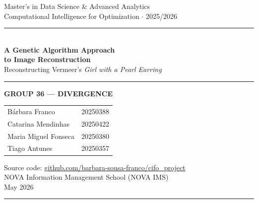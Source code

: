 \documentclass[11pt,a4paper]{article}
\begin{document}

\begin{titlepage}
\thispagestyle{empty}
\centering
\vspace*{1.5cm}

{\small\color{darkgray} Master's in Data Science \& Advanced Analytics}\\[2pt]
{\small\color{darkgray} Computational Intelligence for Optimization $\cdot$ 2025/2026}
\vspace{1.5cm}

{\color{novagreen}\rule{\linewidth}{2pt}}\\[10pt]
{\LARGE\bfseries\color{darkgray} A Genetic Algorithm Approach\\[6pt]
to Image Reconstruction}\\[10pt]
{\large\color{darkgray} Reconstructing Vermeer's \textit{Girl with a Pearl Earring}}\\[10pt]
{\color{novagreen}\rule{\linewidth}{2pt}}
\vspace{2cm}

{\small\bfseries\color{darkgray} GROUP 36 --- DIVERGENCE}\\[0.8em]
{\small\color{darkgray}
  \begin{tabular}{ll}
    Bárbara Franco           & 20250388 \\[4pt]
    Catarina Mendinhas       & 20250422 \\[4pt]
    Maria Miguel Fonseca     & 20250380 \\[4pt]
    Tiago Antunes            & 20250357 \\[4pt]
  \end{tabular}
}
\vfill

{\small\color{darkgray} Source code:
\href{https://github.com/barbara-sousa-franco/cifo_project}{github.com/barbara-sousa-franco/cifo\_project}}\\[8pt]
{\small\color{darkgray} NOVA Information Management School (NOVA IMS)}\\[4pt]
{\small\color{darkgray} May 2026}
\vspace{0.4cm}\\
{\color{novagreen}\rule{\linewidth}{1pt}}

\end{titlepage}



\tableofcontents
\thispagestyle{empty}
\newpage
\end{document}
